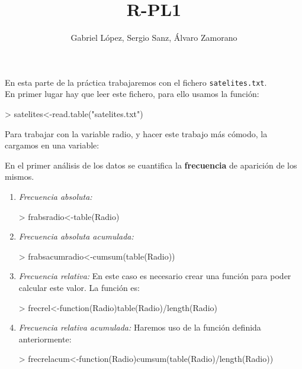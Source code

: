 \documentclass [a4paper] {article}
\title{R-PL1}
\author{Gabriel L\'opez, Sergio Sanz, \'Alvaro Zamorano}
\begin{document}
\maketitle

En esta parte de la pr\'actica trabajaremos con el fichero
\texttt{satelites.txt}.\\

\bigskip
En primer lugar hay que leer este fichero, para ello usamos
la funci\'on:
\begin{Schunk}
\begin{Sinput}
> satelites<-read.table("satelites.txt")
\end{Sinput}
\end{Schunk}

\bigskip
Para trabajar con la variable radio, y hacer este trabajo m\'as
c\'omodo, la cargamos en una variable:
\begin{Schunk}
\end{Schunk}

\bigskip
En el primer an\'alisis de los datos se cuantifica la \textbf{frecuencia}
de aparici\'on de los mismos. 

\begin{enumerate}
\item
\textit{Frecuencia absoluta: }
\begin{Schunk}
\begin{Sinput}
> frabsradio<-table(Radio)
\end{Sinput}
\end{Schunk}

\item
\textit{Frecuencia absoluta acumulada: }
\begin{Schunk}
\begin{Sinput}
> frabsacumradio<-cumsum(table(Radio))
\end{Sinput}
\end{Schunk}

\item
\textit{Frecuencia relativa: }En este caso es necesario crear una funci\'on
para poder calcular este valor. La funci\'on es:
\begin{Schunk}
\begin{Sinput}
> frecrel<-function(Radio){table(Radio)/length(Radio)}
\end{Sinput}
\end{Schunk}

\item
\textit{Frecuencia relativa acumulada: }Haremos uso de la funci\'on definida anteriormente:
\begin{Schunk}
\begin{Sinput}
> frecrelacum<-function(Radio){cumsum(table(Radio)/length(Radio))}
\end{Sinput}
\end{Schunk}
\end{enumerate}
\end{document}
